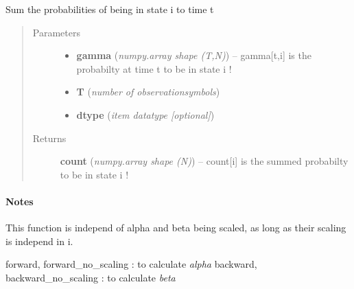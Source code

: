 \documentclass[letterpaper,10pt,english]{sphinxmanual}
\begin{document}

\begin{fulllineitems}
\label{hmm:kernel.python.state_counts}
Sum the probabilities of being in state i to time t
\begin{quote}\begin{description}
\item[{Parameters}] \leavevmode\begin{itemize}
\item {} 
\textbf{gamma} (\emph{numpy.array shape (T,N)}) --
gamma{[}t,i{]} is the probabilty at time t to be in state i !

\item {} 
\textbf{T} (\emph{number of observationsymbols})

\item {} 
\textbf{dtype} (\emph{item datatype {[}optional{]}})

\end{itemize}

\item[{Returns}] \leavevmode
\textbf{count} (\emph{numpy.array shape (N)}) --
count{[}i{]} is the summed probabilty to be in state i !

\end{description}\end{quote}
\paragraph{Notes}

This function is independ of alpha and beta being scaled, as long as their
scaling is independ in i.




forward, forward\_no\_scaling : to calculate \emph{alpha}
backward, backward\_no\_scaling : to calculate \emph{beta}



\end{fulllineitems}

\end{document}
